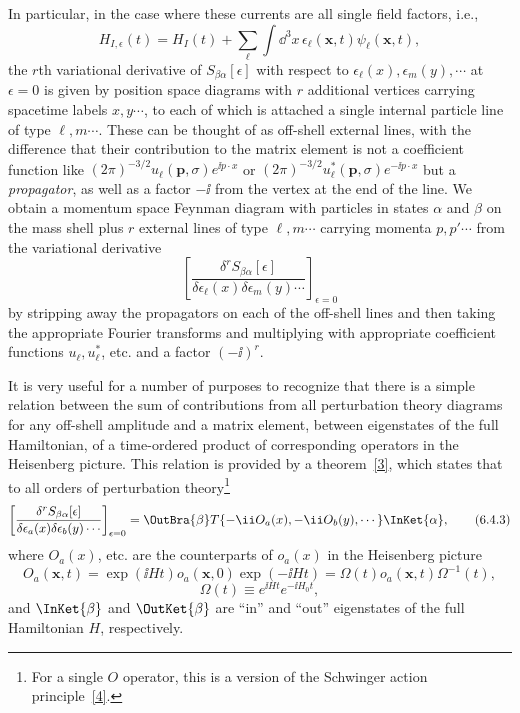 In particular, in the case where these currents are all single field factors,
i.e.,
\[
H_{I,\epsilon}(t)=H_I(t)+\sum_\ell\int \dd^3x\,
\epsilon_\ell(\mathbf x,t)\psi_\ell(\mathbf x,t),
\]
the $r$th variational derivative of $S_{\beta\alpha}[\epsilon]$ with respect to
$\epsilon_\ell(x),\epsilon_m(y),\cdots$ at $\epsilon=0$ is given by position
space diagrams with $r$ additional vertices carrying spacetime labels
$x,y\cdots$, to each of which is attached a single internal particle line of
type $\ell,m\cdots$. These can be thought of as off-shell external lines, with
the difference that their contribution to the matrix element is not a
coefficient function like $(2\pi)^{-3/2}u_\ell(\mathbf p,\sigma)e^{\ii p\cdot x}$
or $(2\pi)^{-3/2}u_\ell^*(\mathbf p,\sigma)e^{-\ii p\cdot x}$ but a
\textit{propagator}, as well as a factor $-\ii$ from the vertex at the end of the
line. We obtain a momentum space Feynman diagram with particles in states
$\alpha$ and $\beta$ on the mass shell plus $r$ external lines of type
$\ell,m\cdots$ carrying momenta $p,p'\cdots$ from the variational derivative
\[
\left[
\frac{\delta^rS_{\beta\alpha}[\epsilon]}
{\delta\epsilon_\ell(x)\delta\epsilon_m(y)\cdots}
\right]_{\epsilon=0}
\]
by stripping away the propagators on each of the off-shell lines and then
taking the appropriate Fourier transforms and multiplying with appropriate
coefficient functions $u_\ell,u_\ell^*$, etc. and a factor $(-\ii)^r$.

It is very useful for a number of purposes to recognize that there is a simple
relation between the sum of contributions from all perturbation theory
diagrams for any off-shell amplitude and a matrix element, between eigenstates
of the full Hamiltonian, of a time-ordered product of corresponding operators
in the Heisenberg picture. This relation is provided by a theorem~\hyperref[ref:6.3]{[3]}, which
states that to all orders of perturbation theory\footnote{For a single $O$
operator, this is a version of the Schwinger action principle~\hyperref[ref:6.4]{[4]}.}
\begin{equation}
\left[
\frac{\delta^rS_{\beta\alpha}[\epsilon]}
{\delta\epsilon_a(x)\delta\epsilon_b(y)\cdots}
\right]_{\epsilon=0}
=\OutBra{\beta}
T\{-\ii O_a(x),-\ii O_b(y),\cdots\}
\InKet{\alpha},
\tag{6.4.3}
\label{eq:6.4.3}
\end{equation}
where $O_a(x)$, etc. are the counterparts of $o_a(x)$ in the Heisenberg
picture
\begin{equation}
O_a(\mathbf x,t)=\exp(\ii Ht)o_a(\mathbf x,0)\exp(-\ii Ht)
=\Omega(t)o_a(\mathbf x,t)\Omega^{-1}(t),
\tag{6.4.4}
\label{eq:6.4.4}
\end{equation}
\begin{equation}
\Omega(t)\equiv e^{\ii Ht}e^{-\ii H_0t},
\tag{6.4.5}
\label{eq:6.4.5}
\end{equation}
and $\InKet{\beta}$ and $\OutKet{\beta}$ are ``in'' and
``out'' eigenstates of the full Hamiltonian $H$, respectively.

